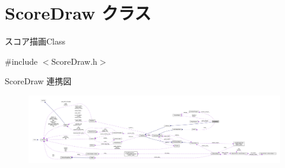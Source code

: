 \hypertarget{class_score_draw}{}\section{Score\+Draw クラス}
\label{class_score_draw}


スコア描画\+Class  




{\ttfamily \#include $<$Score\+Draw.\+h$>$}



Score\+Draw 連携図\nopagebreak
\begin{figure}[H]
\begin{center}
\leavevmode
\includegraphics[width=350pt]{class_score_draw__coll__graph}
\end{center}
\end{figure}
